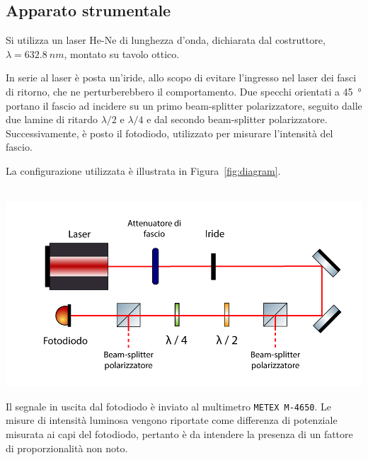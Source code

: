 \documentclass[10pt,oneside,a4paper]{article}
\newenvironment{Figure}
  {\par\medskip\noindent\minipage{\linewidth}}
  {\endminipage\par\medskip}
\begin{document}
\begin{multicols}{2}
\section{Apparato strumentale}

Si utilizza un laser He-Ne di lunghezza d'onda, dichiarata dal costruttore, $\lambda = \SI{632.8}{nm}$, montato su tavolo ottico. 

In serie al laser è posta un'iride, allo scopo di evitare l'ingresso nel laser dei fasci di ritorno, che ne perturberebbero il comportamento. Due specchi orientati a \SI{45}{\degree} portano il fascio ad incidere su un primo beam-splitter polarizzatore, seguito dalle due lamine di ritardo $\lambda / 2$ e $\lambda / 4$ e dal secondo beam-splitter polarizzatore. Successivamente, è posto il fotodiodo, utilizzato per misurare l'intensità del fascio.

La configurazione utilizzata è illustrata in Figura~\ref{fig:diagram}.

\begin{Figure}
	\begin{center}
	\hbox{\hspace{-0.8cm}
	\includegraphics[width=1.1\linewidth]{diagram.png}}
	\label{fig:diagram}
	\end{center}
\end{Figure}

Il segnale in uscita dal fotodiodo è inviato al multimetro \texttt{METEX M-4650}. Le misure di intensità luminosa vengono riportate come differenza di potenziale misurata ai capi del fotodiodo, pertanto è da intendere la presenza di un fattore di proporzionalità non noto.


\end{multicols}
\end{document}
